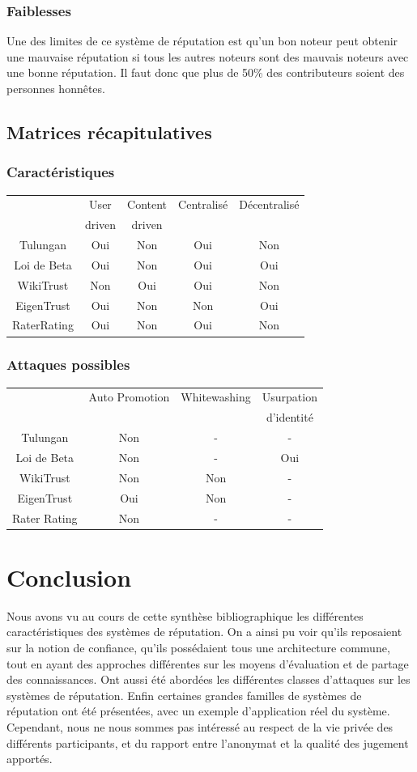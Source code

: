 \documentclass[a4paper, 11pt]{article} %
\begin{document}
\subsubsection{Faiblesses}
Une des limites de ce système de réputation est qu'un bon noteur peut obtenir une mauvaise réputation si tous les autres noteurs sont des mauvais noteurs avec une bonne réputation. Il faut donc que plus de 50\% des contributeurs soient des personnes honnêtes.

\subsection{Matrices récapitulatives}
\subsubsection{Caractéristiques}
\begin{center}
\begin{tabular}{|c|c|c|c|c|}
	\hline
	&User&Content&Centralisé&Décentralisé\tabularnewline
	&driven&driven&&\tabularnewline
	\hline
	Tulungan&Oui&Non&Oui&Non\tabularnewline
	\hline
	Loi de Beta&Oui&Non&Oui&Oui\tabularnewline
	\hline
	WikiTrust&Non&Oui&Oui&Non\tabularnewline
	\hline
	EigenTrust&Oui&Non&Non&Oui\tabularnewline
	\hline
	RaterRating&Oui&Non&Oui&Non\tabularnewline
	\hline
\end{tabular}
\end{center}

\subsubsection{Attaques possibles}
\begin{center}
\begin{tabular}{|c|c|c|c|}
	\hline
	&Auto Promotion&Whitewashing&Usurpation\tabularnewline
	&&&d'identité\tabularnewline
	\hline
	Tulungan&Non&-&-\tabularnewline
	\hline
	Loi de Beta&Non&-&Oui\tabularnewline
	\hline
	WikiTrust&Non&Non&-\tabularnewline
	\hline
	EigenTrust&Oui&Non&-\tabularnewline
	\hline
	Rater Rating&Non&-&-\tabularnewline
	\hline
\end{tabular}
\end{center}

\section{Conclusion}
Nous avons vu au cours de cette synthèse bibliographique les différentes caractéristiques des systèmes de réputation.
On a ainsi pu voir qu'ils reposaient sur la notion de confiance, qu'ils possédaient tous une architecture commune, tout en ayant des approches différentes sur les moyens d'évaluation et de partage des connaissances.
Ont aussi été abordées les différentes classes d'attaques sur les systèmes de réputation.
Enfin certaines grandes familles de systèmes de réputation ont été présentées, avec un exemple d'application réel du système.
Cependant, nous ne nous sommes pas intéressé au respect de la vie privée des différents participants, et du rapport entre l'anonymat et la qualité des jugement apportés.
\end{document}
